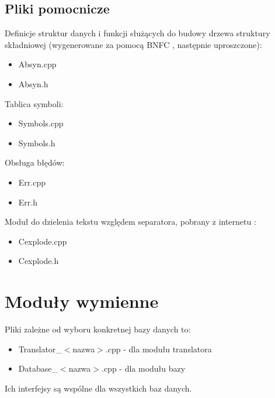 \section{Pliki pomocnicze}
Definicje struktur danych i funkcji służących do budowy drzewa struktury składniowej (wygenerowane za pomocą BNFC \cite{bnfc}, 
następnie uproszczone):
\begin{itemize}
 \item Absyn.cpp
 \item Absyn.h
\end{itemize}
Tablica symboli:
\begin{itemize}
 \item Symbols.cpp
\item Symbols.h
\end{itemize}
Obsługa błędów:
\begin{itemize}
 \item Err.cpp
\item Err.h
\end{itemize}
Moduł do dzielenia tekstu względem separatora, pobrany z internetu \cite{cexplode}:
\begin{itemize}
 \item Cexplode.cpp
 \item Cexplode.h
\end{itemize}


\chapter{Moduły wymienne}
Pliki zależne od wyboru konkretnej bazy danych to:
\begin{itemize}
 \item Translator\_$<$nazwa$>$.cpp - dla modułu translatora
\item Database\_$<$nazwa$>$.cpp - dla modułu bazy
\end{itemize}
Ich interfejsy są wspólne dla wszystkich baz danych.
